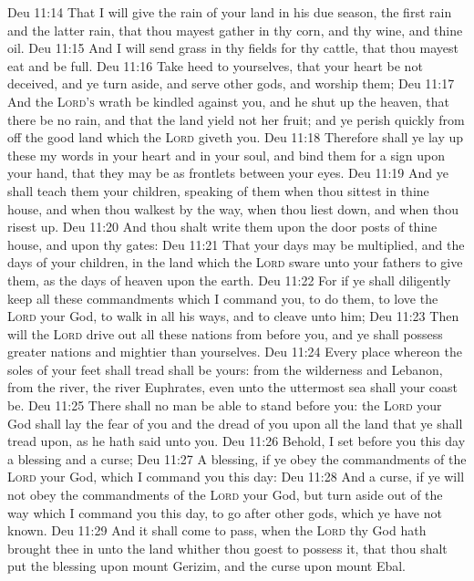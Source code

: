 \vs Deu 11:14 That I will give  the rain of your land in his due season, the first rain and the latter rain, that thou mayest gather in thy corn, and thy wine, and thine oil.
\vs Deu 11:15 And I will send grass in thy fields for thy cattle, that thou mayest eat and be full.
\vs Deu 11:16 Take heed to yourselves, that your heart be not deceived, and ye turn aside, and serve other gods, and worship them;
\vs Deu 11:17 And  the \textsc{Lord's} wrath be kindled against you, and he shut up the heaven, that there be no rain, and that the land yield not her fruit; and  ye perish quickly from off the good land which the \textsc{Lord} giveth you.
\vs Deu 11:18 Therefore shall ye lay up these my words in your heart and in your soul, and bind them for a sign upon your hand, that they may be as frontlets between your eyes.
\vs Deu 11:19 And ye shall teach them your children, speaking of them when thou sittest in thine house, and when thou walkest by the way, when thou liest down, and when thou risest up.
\vs Deu 11:20 And thou shalt write them upon the door posts of thine house, and upon thy gates:
\vs Deu 11:21 That your days may be multiplied, and the days of your children, in the land which the \textsc{Lord} sware unto your fathers to give them, as the days of heaven upon the earth.
\vs Deu 11:22 For if ye shall diligently keep all these commandments which I command you, to do them, to love the \textsc{Lord} your God, to walk in all his ways, and to cleave unto him;
\vs Deu 11:23 Then will the \textsc{Lord} drive out all these nations from before you, and ye shall possess greater nations and mightier than yourselves.
\vs Deu 11:24 Every place whereon the soles of your feet shall tread shall be yours: from the wilderness and Lebanon, from the river, the river Euphrates, even unto the uttermost sea shall your coast be.
\vs Deu 11:25 There shall no man be able to stand before you:  the \textsc{Lord} your God shall lay the fear of you and the dread of you upon all the land that ye shall tread upon, as he hath said unto you.
\vs Deu 11:26 Behold, I set before you this day a blessing and a curse;
\vs Deu 11:27 A blessing, if ye obey the commandments of the \textsc{Lord} your God, which I command you this day:
\vs Deu 11:28 And a curse, if ye will not obey the commandments of the \textsc{Lord} your God, but turn aside out of the way which I command you this day, to go after other gods, which ye have not known.
\vs Deu 11:29 And it shall come to pass, when the \textsc{Lord} thy God hath brought thee in unto the land whither thou goest to possess it, that thou shalt put the blessing upon mount Gerizim, and the curse upon mount Ebal.
